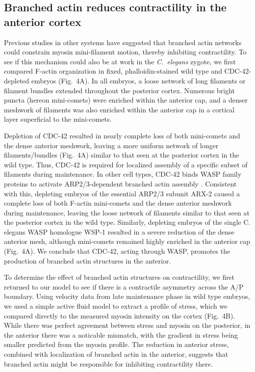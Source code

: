 \documentclass[11pt]{article}
\newcommand{\6}[1]{#1_{\text{6}}}
\newcommand{\3}[1]{#1_{\text{3}}}
\begin{document}
\subsection*{Branched actin reduces contractility in the anterior cortex }
Previous studies in other systems \citep{yang2012arp2, muresan2022f} have suggested that branched actin networks could constrain myosin mini-filament motion, thereby inhibiting contractility. To see if this mechanism could also be at work in the \emph{C.\ elegans} zygote, we first compared F-actin organization in fixed, phalloidin-stained wild type and CDC-42-depleted embryos (Fig.\ 4A). In all embryos, a loose network of long filaments or filament bundles extended throughout the posterior cortex. Numerous bright puncta (hereon mini-comets) were enriched within the anterior cap, and a denser meshwork of filaments was also enriched within the anterior cap in a cortical layer superficial to the mini-comets.

Depletion of CDC-42 resulted in nearly complete loss of both mini-comets and the dense anterior meshwork, leaving a more uniform network of longer filaments/bundles (Fig.\ 4A) similar to that seen at the posterior cortex in the wild type. Thus, CDC-42 is required for localized assembly of a specific subset of filaments during maintenance. In other cell types, CDC-42 binds WASP family proteins to activate ARP2/3-dependent branched actin assembly \citep{pollitt2009wasp}. Consistent with this, depleting embryos of the essential ARP2/3 subunit ARX-2 caused a complete loss of both F-actin mini-comets and the dense anterior meshwork during maintenance, leaving the loose network of filaments similar to that seen at the posterior cortex in the wild type. Similarly, depleting embryos of the single C. elegans WASP homologue WSP-1 resulted in a severe reduction of the dense anterior mesh, although mini-comets remained highly enriched in the anterior cap (Fig.\ 4A). We conclude that CDC-42, acting through WASP, promotes the production of branched actin structures in the anterior.

To determine the effect of branched actin structures on contractility, we first returned to our model to see if there is a contractile asymmetry across the A/P boundary. Using velocity data from late maintenance phase in wild type embryos, we used a simple active fluid model \citep{mayer2010anisotropies} to extract a profile of stress, which we compared directly to the measured myosin intensity on the cortex (Fig.\ 4B). While there was perfect agreement between stress and myosin on the posterior, in the anterior there was a noticable mismatch, with the gradient in stress being smaller predicted from the myosin profile. The reduction in anterior stress, combined with localization of branched actin in the anterior, suggests that branched actin might be responsible for inhibiting contractility there. 
\end{document}
